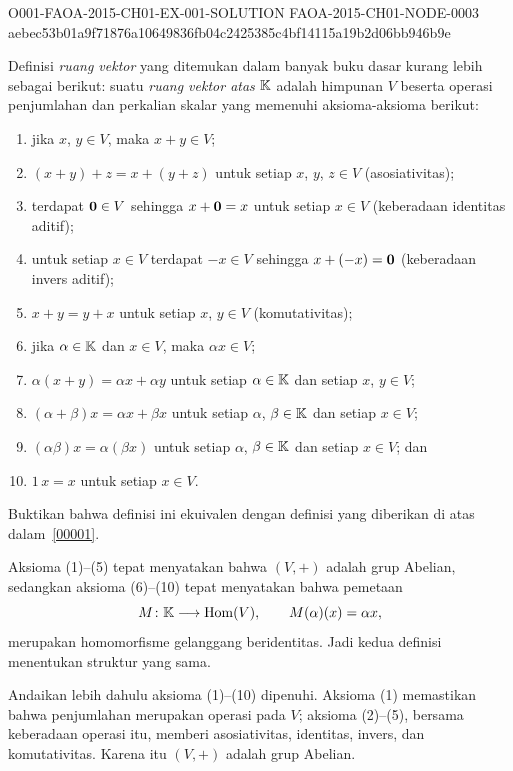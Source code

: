 \begin{o001solution}
  {O001-FAOA-2015-CH01-EX-001-SOLUTION}
  {FAOA-2015-CH01-NODE-0003}
  {aebec53b01a9f71876a10649836fb04c2425385c4bf14115a19b2d06bb946b9e}
\begin{o001statement}
Definisi \emph{ruang vektor} yang ditemukan dalam banyak buku dasar kurang lebih
sebagai berikut: suatu \emph{ruang vektor atas} $\mathbb{K}$ adalah himpunan $V$ beserta operasi
penjumlahan dan perkalian skalar yang memenuhi aksioma-aksioma berikut:
 \begin{enumerate}
  \item[(1)] jika $x$, $y \in V$, maka $x + y \in V$;
  \item[(2)] $(x + y) + z = x + (y + z)$ untuk setiap
$x$, $y$, $z \in V$ (asosiativitas);
  \item[(3)] terdapat $\mathbf{0} \in V$ sehingga $x + \mathbf{0} = x$ untuk setiap
$x \in V$ (keberadaan identitas aditif);
  \item[(4)] untuk setiap $x\in V$ terdapat $-x \in V$ sehingga
$x + (-x) = \mathbf{0}$ (keberadaan invers aditif);
  \item[(5)] $x + y = y + x$ untuk setiap $x$, $y \in V$
(komutativitas);
  \item[(6)] jika $\alpha \in \mathbb{K}$ dan $x \in V$, maka $\alpha x \in V$;
  \item[(7)] $\alpha (x + y) = \alpha x + \alpha y$ untuk setiap $\alpha \in \mathbb{K}$
dan setiap $x$, $y \in V$;
  \item[(8)] $(\alpha + \beta)x = \alpha x + \beta x$ untuk setiap $\alpha$,
$\beta \in \mathbb{K}$ dan setiap $x \in V$;
  \item[(9)] $(\alpha\beta)x = \alpha(\beta x)$ untuk setiap $\alpha$,
$\beta \in \mathbb{K}$ dan setiap $x \in V$; dan
  \item[(10)] $1\,x = x$ untuk setiap $x \in V$.
 \end{enumerate}
Buktikan bahwa definisi ini ekuivalen dengan definisi yang diberikan di atas dalam~\ref{00001}.
\end{o001statement}
\begin{o001answer}
Aksioma (1)--(5) tepat menyatakan bahwa $(V,+)$ adalah grup Abelian, sedangkan
aksioma (6)--(10) tepat menyatakan bahwa pemetaan
\[
 M\colon\mathbb{K}\longrightarrow\operatorname{Hom}(V),\qquad M(\alpha)(x)=\alpha x,
\]
merupakan homomorfisme gelanggang beridentitas. Jadi kedua definisi menentukan
struktur yang sama.
\end{o001answer}
\begin{o001proof}
Andaikan lebih dahulu aksioma (1)--(10) dipenuhi. Aksioma (1) memastikan bahwa
penjumlahan merupakan operasi pada $V$; aksioma (2)--(5), bersama keberadaan
operasi itu, memberi asosiativitas, identitas, invers, dan komutativitas.
Karena itu $(V,+)$ adalah grup Abelian.


\end{o001proof}
\end{o001solution}
